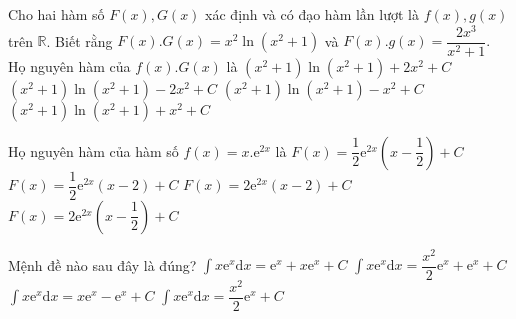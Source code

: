 \begin{ex}
	Cho hai hàm số $ F(x),G(x)$ xác định và có đạo hàm lần lượt là $ f(x),g(x)$ trên $\mathbb{R}$. Biết rằng $ F(x).G(x)=x^2\ln \left(x^2+1\right)$ và $ F(x).g(x)=\dfrac{2x^3}{x^2+1}.$ Họ nguyên hàm của $ f(x).G(x)$ là
	\choice
	{$\left(x^2+1\right)\ln \left(x^2+1\right)+2x^2+C$}
	{$\left(x^2+1\right)\ln \left(x^2+1\right)-2x^2+C$}
	{\True $\left(x^2+1\right)\ln \left(x^2+1\right)-x^2+C$}
	{$\left(x^2+1\right)\ln \left(x^2+1\right)+x^2+C$}
\end{ex}
\begin{ex}%
	Họ nguyên hàm của hàm số $ f(x)=x.\mathrm{e}^{2x}$ là
	\choice
	{\True $ F(x)=\dfrac{1}{2}{\mathrm{e}^{2x}}\left(x-\dfrac{1}{2}\right)+C$}
	{$ F(x)=\dfrac{1}{2}{\mathrm{e}^{2x}}\left(x-2\right)+C$}
	{$ F(x)=2\mathrm{e}^{2x}\left(x-2\right)+C$}
	{$ F(x)=2\mathrm{e}^{2x}\left(x-\dfrac{1}{2}\right)+C$}
\end{ex}
\begin{ex}
	Mệnh đề nào sau đây là đúng?
	\choice
	{$\displaystyle\int{x{\mathrm{e}^x}}\mathrm{d}x=\mathrm{e}^x+x{\mathrm{e}^x}+C$}
	{$\displaystyle\int{x{\mathrm{e}^x}}\mathrm{d}x=\dfrac{x^2}{2}{\mathrm{e}^x}+\mathrm{e}^x+C$}
	{\True $\displaystyle\int{x{\mathrm{e}^x}\mathrm{d}x}=x{\mathrm{e}^x}-\mathrm{e}^x+C$}
	{$\displaystyle\int{x{\mathrm{e}^x}}\mathrm{d}x=\dfrac{x^2}{2}{\mathrm{e}^x}+C$}
\end{ex}
